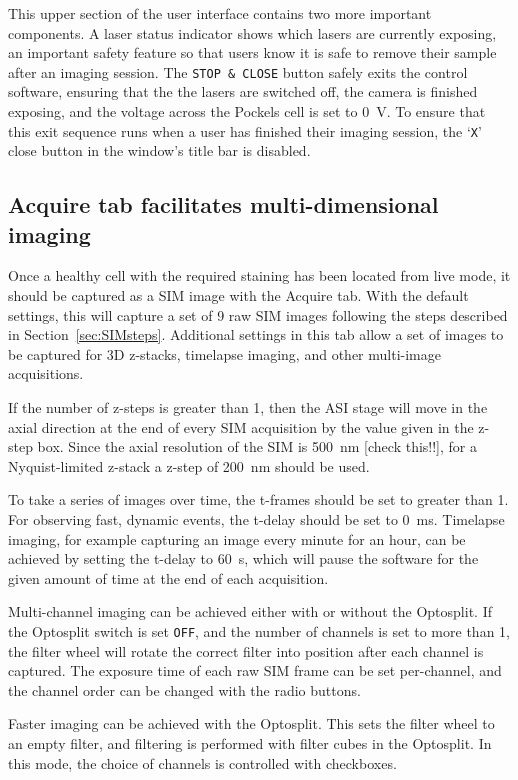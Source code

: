This upper section of the user interface contains two more important components. 
A laser status indicator shows which lasers are currently exposing, an important safety feature so that users know it is safe to remove their sample after an imaging session. 
The \texttt{STOP \& CLOSE} button safely exits the control software, ensuring that the the lasers are switched off, the camera is finished exposing, and the voltage across the Pockels cell is set to \SI{0}{\volt}. 
To ensure that this exit sequence runs when a user has finished their imaging session, the `\texttt{X}' close button in the window's title bar is disabled. 

\subsection{Acquire tab facilitates multi-dimensional imaging}
Once a healthy cell with the required staining has been located from live mode, it should be captured as a SIM image with the Acquire tab. 
With the default settings, this will capture a set of 9 raw SIM images following the steps described in Section~\ref{sec:SIMsteps}.
Additional settings in this tab allow a set of images to be captured for 3D z-stacks, timelapse imaging, and other multi-image acquisitions. 

If the number of z-steps is greater than 1, then the ASI stage will move in the axial direction at the end of every SIM acquisition by the value given in the z-step box. 
Since the axial resolution of the SIM is \SI{500}{\nano\meter} [check this!!], for a Nyquist-limited z-stack a z-step of \SI{200}{\nano\meter} should be used. 

To take a series of images over time, the t-frames should be set to greater than 1.
For observing fast, dynamic events, the t-delay should be set to \SI{0}{\milli\second}. 
Timelapse imaging, for example capturing an image every minute for an hour, can be achieved by setting the t-delay to \SI{60}{\second}, which will pause the software for the given amount of time at the end of each acquisition. 

Multi-channel imaging can be achieved either with or without the Optosplit. 
If the Optosplit switch is set \texttt{OFF}, and the number of channels is set to more than 1, the filter wheel will rotate the correct filter into position after each channel is captured. 
The exposure time of each raw SIM frame can be set per-channel, and the channel order can be changed with the radio buttons. 

Faster imaging can be achieved with the Optosplit. 
This sets the filter wheel to an empty filter, and filtering is performed with filter cubes in the Optosplit. 
In this mode, the choice of channels is controlled with checkboxes. 

